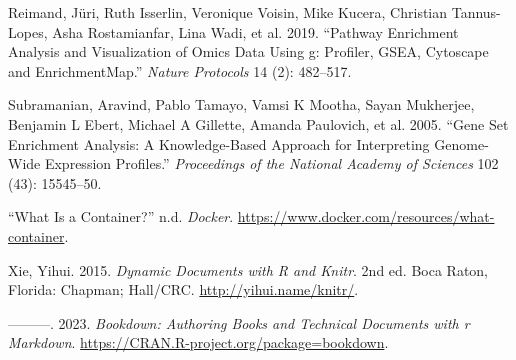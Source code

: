 \documentclass[
]{book}
\newlength{\cslhangindent}
\newlength{\cslentryspacingunit} %
\newenvironment{CSLReferences}[2] %
 {%
  \setlength{\parindent}{0pt}
  \ifodd #1
  \let\oldpar\par
  \def\par{\hangindent=\cslhangindent\oldpar}
  \fi
  \setlength{\parskip}{#2\cslentryspacingunit}
 }%
 {}
\begin{document}
\hypertarget{refs}{}
\begin{CSLReferences}{1}{0}
\leavevmode{}%
Reimand, Jüri, Ruth Isserlin, Veronique Voisin, Mike Kucera, Christian Tannus-Lopes, Asha Rostamianfar, Lina Wadi, et al. 2019. {``Pathway Enrichment Analysis and Visualization of Omics Data Using g: Profiler, GSEA, Cytoscape and EnrichmentMap.''} \emph{Nature Protocols} 14 (2): 482--517.

\leavevmode{}%
Subramanian, Aravind, Pablo Tamayo, Vamsi K Mootha, Sayan Mukherjee, Benjamin L Ebert, Michael A Gillette, Amanda Paulovich, et al. 2005. {``Gene Set Enrichment Analysis: A Knowledge-Based Approach for Interpreting Genome-Wide Expression Profiles.''} \emph{Proceedings of the National Academy of Sciences} 102 (43): 15545--50.

\leavevmode{}%
{``What Is a Container?''} n.d. \emph{Docker}. \url{https://www.docker.com/resources/what-container}.

\leavevmode{}%
Xie, Yihui. 2015. \emph{Dynamic Documents with {R} and Knitr}. 2nd ed. Boca Raton, Florida: Chapman; Hall/CRC. \url{http://yihui.name/knitr/}.

\leavevmode{}%
---------. 2023. \emph{Bookdown: Authoring Books and Technical Documents with r Markdown}. \url{https://CRAN.R-project.org/package=bookdown}.

\end{CSLReferences}
\end{document}
